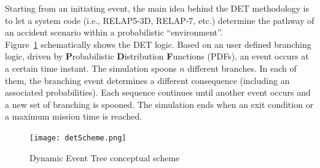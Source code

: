 \documentclass{anstrans}
\begin{document}
Starting from an initiating event, the main idea behind the DET methodology is to let a system code (i.e., RELAP5-3D, RELAP-7, etc.) determine the pathway of an accident scenario within a probabilistic ``environment''. \\ Figure~\ref{fig:detScheme} schematically shows the DET logic. Based on an user defined branching logic, driven by \textbf{P}robabilistic \textbf{D}istribution \textbf{F}unctions (PDFs), an event occurs at a certain time instant. The simulation spoons $n$ different branches. In each of them, the branching event determines a different consequence (including an associated probabilities). Each sequence continues until another event occurs and a new set of branching is spooned. The simulation ends when an exit condition or a maximum mission time is reached.       
\begin{figure} %
  \centering
  \texttt{[image: detScheme.png]}
  \caption{Dynamic Event Tree conceptual scheme}
  \label{fig:detScheme}
\end{figure} 
\end{document}
